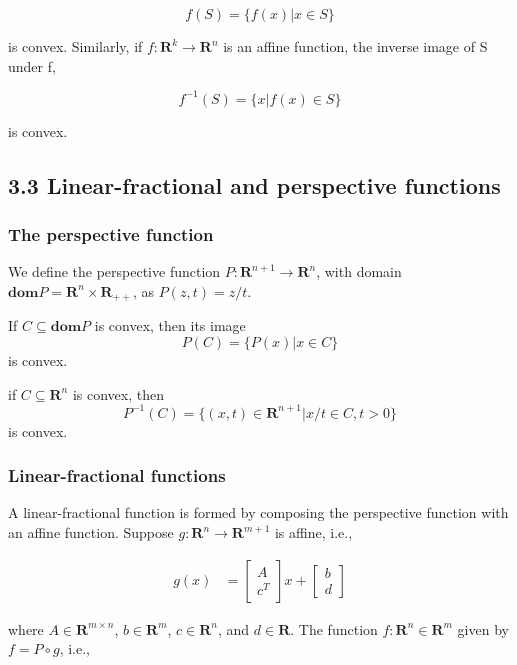 \documentclass{article}
\begin{document}
\[
f(S)=\{f(x)|x\in S\}    
\]

is convex. Similarly, if $f:\mathbf{R}^k \rightarrow \mathbf{R}^n$ is an affine function, the inverse image of S
under f,

\[
f^{-1}(S)=\{x|f(x)\in S\}    
\]

is convex.

\subsection*{3.3 Linear-fractional and perspective functions}

\subsubsection*{The perspective function}

We define the perspective function $P:\mathbf{R}^{n+1} \rightarrow \mathbf{R}^n$, with domain $\mathbf{dom}P=\mathbf{R}^n\times \mathbf{R}_{++}$, as $P(z,t)=z/t$.

If $C \subseteq \mathbf{dom} P$ is convex, then its image
\[
    P(C)=\{P(x) | x \in C\}
\]
is convex.

if $C \subseteq \mathbf{R}^n$ is convex, then
\[
    P^{-1}(C) = \{(x, t) \in \mathbf{R}^{n+1} | x/t \in C, t > 0\}
\]
is convex.

\subsubsection*{Linear-fractional functions}

A linear-fractional function is formed by composing the perspective function with
an affine function. Suppose $g:\mathbf{R}^n \rightarrow \mathbf{R}^{m+1}$ is affine, i.e.,

\begin{equation*}
    \begin{split}
        g(x)&=\begin{bmatrix}
            A\\
            c^T
        \end{bmatrix}x+
        \begin{bmatrix}
            b\\
            d
        \end{bmatrix}
    \end{split}
\end{equation*}

where $A \in \mathbf{R}^{m\times n}$, $b \in \mathbf{R}^m$, $c \in \mathbf{R}^n$, and $d \in \mathbf{R}$. The function $f : \mathbf{R}^n \in \mathbf{R}^m$ given
by $f=P\circ g$, i.e.,
\end{document}
